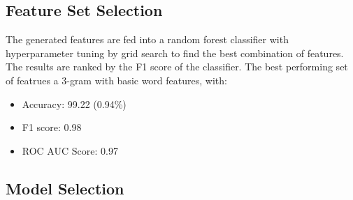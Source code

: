 \documentclass{article}
\begin{document}
    \subsection{Feature Set Selection}
    The generated features are fed into a random forest classifier with hyperparameter tuning by grid search to find the best combination of features.
    The results are ranked by the F1 score of the classifier. The best performing set of featrues a 3-gram with basic word features, with:
    \begin{itemize}
        \item Accuracy: 99.22 (0.94\%)
        \item F1 score: 0.98
        \item ROC AUC Score:  0.97
    \end{itemize}
    \subsection{Model Selection}
\end{document}
